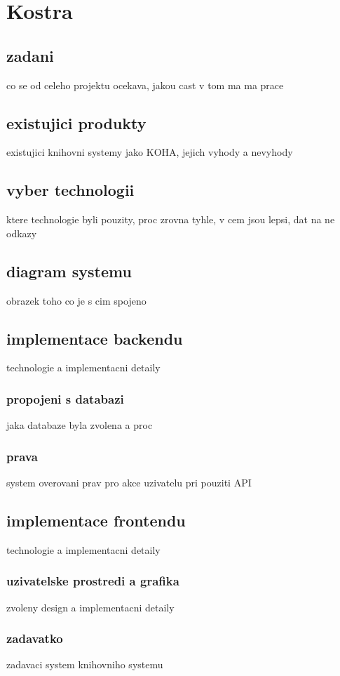 \chapter{Kostra}

\section{zadani}
co se od celeho projektu ocekava, jakou cast v tom ma ma prace

\section{existujici produkty}
existujici knihovni systemy jako KOHA, jejich vyhody a nevyhody

\section{vyber technologii}
ktere technologie byli pouzity, proc zrovna tyhle, v cem jsou lepsi, dat na ne odkazy

\section{diagram systemu}
obrazek toho co je s cim spojeno

\section{implementace backendu}
technologie a implementacni detaily
\subsection{propojeni s databazi}
jaka databaze byla zvolena a proc
\subsection{prava}
system overovani prav pro akce uzivatelu pri pouziti API

\section{implementace frontendu}
technologie a implementacni detaily
\subsection{uzivatelske prostredi a grafika}
zvoleny design a implementacni detaily
\subsection{zadavatko}
zadavaci system knihovniho systemu
